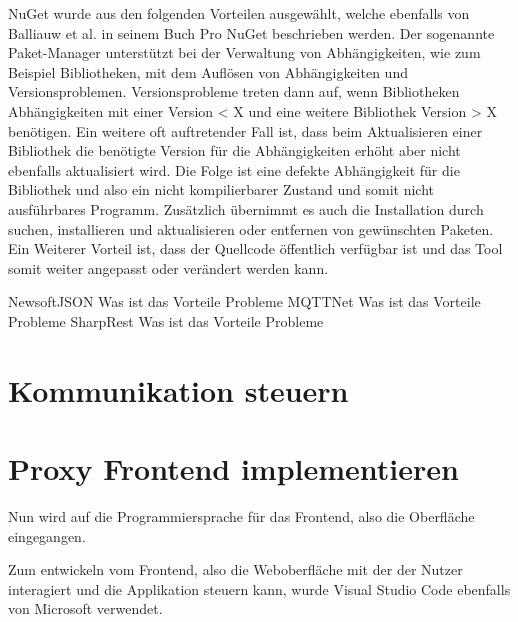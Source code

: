     
    NuGet wurde aus den folgenden Vorteilen ausgewählt, welche ebenfalls von Balliauw et al. in seinem Buch Pro NuGet \cite{balliauw2012pro} beschrieben werden.
    Der sogenannte Paket-Manager unterstützt bei der Verwaltung von Abhängigkeiten, wie zum Beispiel Bibliotheken, mit dem Auflösen von Abhängigkeiten und Versionsproblemen. Versionsprobleme treten dann auf, wenn Bibliotheken Abhängigkeiten mit einer Version < X und eine weitere Bibliothek Version > X benötigen. Ein weitere oft auftretender Fall ist, dass beim Aktualisieren einer Bibliothek die benötigte Version für die Abhängigkeiten erhöht aber nicht ebenfalls aktualisiert wird. Die Folge ist eine defekte Abhängigkeit für die Bibliothek und also ein nicht kompilierbarer Zustand  und somit nicht ausführbares Programm. Zusätzlich übernimmt es auch die Installation durch suchen, installieren und aktualisieren oder entfernen von gewünschten Paketen. Ein Weiterer Vorteil ist, dass der Quellcode öffentlich verfügbar ist und das Tool somit weiter angepasst oder verändert werden kann.
    
    NewsoftJSON
        Was ist das
        Vorteile
        Probleme
    MQTTNet
        Was ist das
        Vorteile
        Probleme
    SharpRest
        Was ist das
        Vorteile
        Probleme
    
\section{Kommunikation steuern}

        
\section{Proxy Frontend implementieren}
    
    Nun wird auf die Programmiersprache für das Frontend, also die Oberfläche eingegangen.
    
    Zum entwickeln vom Frontend, also die Weboberfläche mit der der Nutzer interagiert und die Applikation steuern kann, wurde Visual Studio Code \cite{microsoft_2016} ebenfalls von Microsoft verwendet.
    
